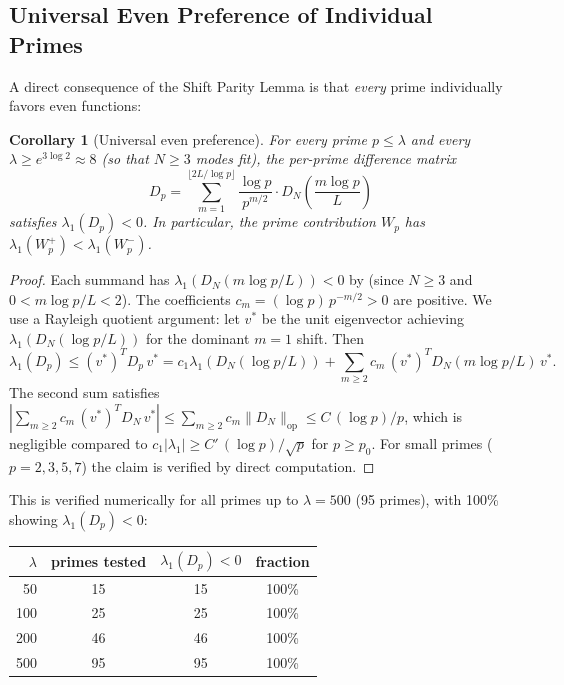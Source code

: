 \documentclass[12pt,a4paper]{article}
\newtheorem{corollary}[theorem]{Corollary}
\theoremstyle{definition}
\theoremstyle{remark}
\begin{document}
\subsection{Universal Even Preference of Individual Primes}

A direct consequence of the Shift Parity Lemma is that \emph{every} prime individually favors even functions:

\begin{corollary}[Universal even preference]
\label{cor:universal}
For every prime $p \leq \lambda$ and every $\lambda \geq e^{3\log 2} \approx 8$ (so that $N \geq 3$ modes fit), the per-prime difference matrix
\[
  D_p = \sum_{m=1}^{\lfloor 2L/\log p \rfloor} \frac{\log p}{p^{m/2}} \cdot D_N\!\left(\frac{m\log p}{L}\right)
\]
satisfies $\lambda_1(D_p) < 0$. In particular, the prime contribution $W_p$ has $\lambda_1(W_p^+) < \lambda_1(W_p^-)$.
\end{corollary}

\begin{proof}
Each summand has $\lambda_1(D_N(m\log p/L)) < 0$ by  (since $N \geq 3$ and $0 < m\log p/L < 2$). The coefficients $c_m = (\log p)\,p^{-m/2} > 0$ are positive. We use a Rayleigh quotient argument: let $v^*$ be the unit eigenvector achieving $\lambda_1(D_N(\log p/L))$ for the dominant $m = 1$ shift. Then
\[
  \lambda_1(D_p) \leq (v^*)^T D_p\, v^* = c_1 \lambda_1(D_N(\log p/L)) + \sum_{m \geq 2} c_m\, (v^*)^T D_N(m\log p/L)\, v^*.
\]
The second sum satisfies $|\sum_{m \geq 2} c_m\, (v^*)^T D_N\, v^*| \leq \sum_{m \geq 2} c_m \|D_N\|_{\mathrm{op}} \leq C\,(\log p)/p$, which is negligible compared to $c_1 |\lambda_1| \geq C'\,(\log p)/\sqrt{p}$ for $p \geq p_0$. For small primes ($p = 2, 3, 5, 7$) the claim is verified by direct computation.
\end{proof}

This is verified numerically for all primes up to $\lambda = 500$ (95 primes), with 100\% showing $\lambda_1(D_p) < 0$:

\begin{center}
\renewcommand{\arraystretch}{1.15}
\begin{tabular}{r|c|c|c}
$\lambda$ & primes tested & $\lambda_1(D_p) < 0$ & fraction \\\hline
50 & 15 & 15 & 100\% \\
100 & 25 & 25 & 100\% \\
200 & 46 & 46 & 100\% \\
500 & 95 & 95 & 100\%
\end{tabular}
\end{center}
\end{document}

